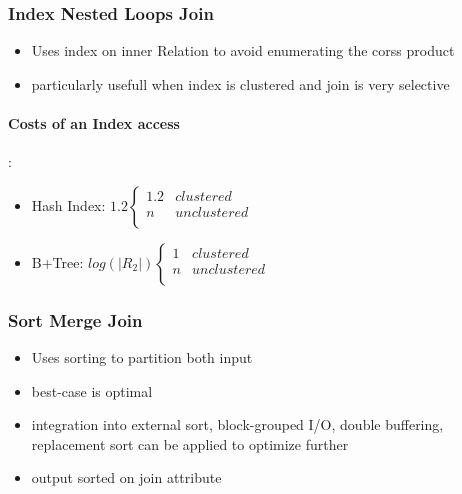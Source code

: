  \subsubsection{Index Nested Loops Join}
 \begin{itemize}
     \item Uses index on inner Relation to avoid enumerating the corss product
     \item particularly usefull when index is clustered and join is very selective
 \end{itemize}
 \paragraph{Costs of an Index access}: \\
 \begin{itemize}
     \item Hash Index: $1.2 \begin{cases} 
      1.2 & clustered \\
      n & unclustered \\
   \end{cases}$
   \item B+Tree:  $log(|R_2|) \begin{cases} 
      1 & clustered \\
      n & unclustered \\
   \end{cases}$
 \end{itemize}
 
 \subsubsection{Sort Merge Join}
 \begin{itemize}
     \item Uses sorting to partition both input
     \item best-case is optimal
     \item integration into external sort, block-grouped I/O, double buffering, replacement sort can be applied to optimize further
     \item output sorted on join attribute 
    \end{itemize}

 
